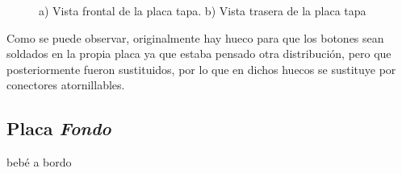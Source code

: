 \begin{figure}[htpb]%
    \centering 
    \hspace{10pt}%
    \caption{a) Vista frontal de la placa tapa. b) Vista trasera de la placa tapa}
    \label{fig:placatapa} 
    \end{figure} 

Como se puede observar, originalmente hay hueco para que los botones sean soldados en la propia placa ya 
que estaba pensado otra distribución, pero que posteriormente fueron sustituidos, por lo que en dichos 
huecos se sustituye por conectores atornillables.
    
\subsection{Placa \textit{Fondo}}

bebé a bordo

